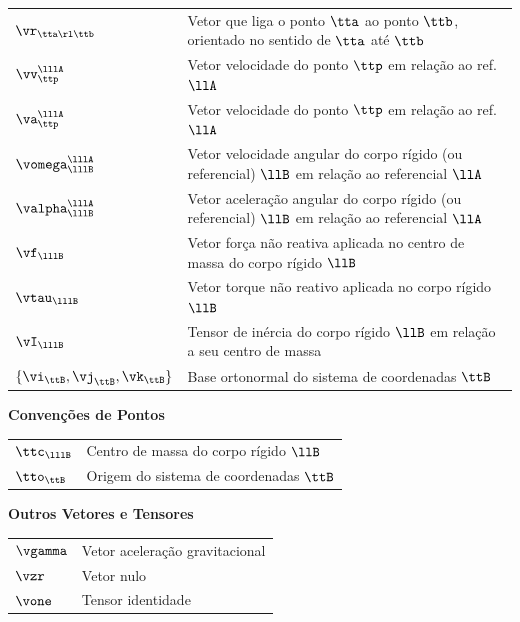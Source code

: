\documentclass[]{politex}
\begin{document}
\begin{longtable}{lp{}}
  $\vr_{\tta \rl \ttb}$ & Vetor que liga o ponto $\tta$ ao ponto $\ttb$, orientado no sentido de $\tta$ até $\ttb$ \\
  $\vv_\ttp^{\lllA}$ & Vetor velocidade do ponto $\ttp$ em relação ao ref. $\llA$ \\
  $\va_\ttp^{\lllA}$ & Vetor velocidade do ponto $\ttp$ em relação ao ref. $\llA$ \\
  $\vomega_{\lllB}^{\lllA}$ & Vetor velocidade angular do corpo rígido (ou referencial) $\llB$ em relação ao referencial $\llA$ \\
  $\valpha_{\lllB}^{\lllA}$ & Vetor aceleração angular do corpo rígido (ou referencial) $\llB$ em relação ao referencial $\llA$ \\
  $\vf_{\lllB}$ & Vetor força não reativa aplicada no centro de massa do corpo rígido $\llB$ \\
  $\vtau_{\lllB}$ & Vetor torque não reativo aplicada no corpo rígido $\llB$ \\
  $\vI_{\lllB}$ & Tensor de inércia do corpo rígido $\llB$ em relação a seu centro de massa \\
  $\{\vi_\ttB, \vj_\ttB, \vk_\ttB \}$ & Base ortonormal do sistema de coordenadas $\ttB$ \\
\end{longtable}
\begin{center} \begin{Large} \textbf{Convenções de Pontos} \end{Large} \end{center}
\begin{longtable}{lp{}}
  $\ttc_{\lllB}$ & Centro de massa do corpo rígido $\llB$ \\
  $\tto_{\ttB}$ & Origem do sistema de coordenadas $\ttB$ \\
\end{longtable}
\begin{center} \begin{Large} \textbf{Outros Vetores e Tensores} \end{Large} \end{center}
\begin{longtable}{lp{}}
  $\vgamma$ & Vetor aceleração gravitacional \\
  $\vzr$ & Vetor nulo \\
  $\vone$ & Tensor identidade \\
\end{longtable}
\end{document}
